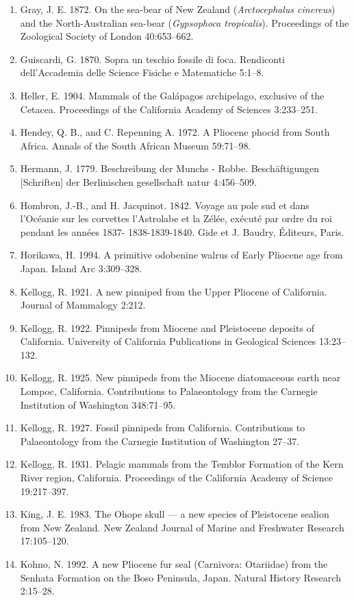 \documentclass[a4paper, 12pt]{article}
\begin{document}
\begin{enumerate}
\item Gray, J. E. 1872. On the sea-bear of New Zealand (\textit{Arctocephalus cinereus}) and the North-Australian sea-bear (\textit{Gypsophoca tropicalis}). Proceedings of the Zoological Society of London 40:653–662.
\item Guiscardi, G. 1870. Sopra un teschio fossile di foca. Rendiconti dell’Accademia delle Science Fisiche e Matematiche 5:1–8.
\item Heller, E. 1904. Mammals of the Gal\'{a}pagos archipelago, exclusive of the Cetacea. Proceedings of the California Academy of Sciences 3:233–251.
\item Hendey, Q. B., and C. Repenning A. 1972. A Pliocene phocid from South Africa. Annals of the South African Museum 59:71–98.
\item Hermann, J. 1779. Beschreibung der Munchs - Robbe. Beschäftigungen [Schriften] der Berlinischen gesellschaft natur 4:456–509.
\item Hombron, J.-B., and H. Jacquinot. 1842. Voyage au pole sud et dans l'Oc\'{e}anie sur les corvettes l'Astrolabe et la Z\'{e}l\'{e}e, ex\'{e}cut\'{e} par ordre du roi pendant les ann\'{e}es 1837- 1838-1839-1840. Gide et J. Baudry, \'{E}diteurs, Paris.
\item Horikawa, H. 1994. A primitive odobenine walrus of Early Pliocene age from Japan. Island Arc 3:309–328.
\item Kellogg, R. 1921. A new pinniped from the Upper Pliocene of California. Journal of Mammalogy 2:212.
\item Kellogg, R. 1922. Pinnipeds from Miocene and Pleistocene deposits of California. University of California Publications in Geological Sciences 13:23–132.
\item Kellogg, R. 1925. New pinnipeds from the Miocene diatomaceous earth near Lompoc, California. Contributions to Palaeontology from the Carnegie Institution of Washington 348:71–95.
\item Kellogg, R. 1927. Fossil pinnipeds from California. Contributions to Palaeontology from the Carnegie Institution of Washington 27–37.
\item Kellogg, R. 1931. Pelagic mammals from the Temblor Formation of the Kern River region, California. Proceedings of the California Academy of Science 19:217–397.
\item King, J. E. 1983. The Ohope skull — a new species of Pleistocene sealion from New Zealand. New Zealand Journal of Marine and Freshwater Research 17:105–120.
\item Kohno, N. 1992. A new Pliocene fur seal (Carnivora: Otariidae) from the Senhata Formation on the Boso Peninsula, Japan. Natural History Research 2:15–28.

\end{enumerate}
\end{document}
